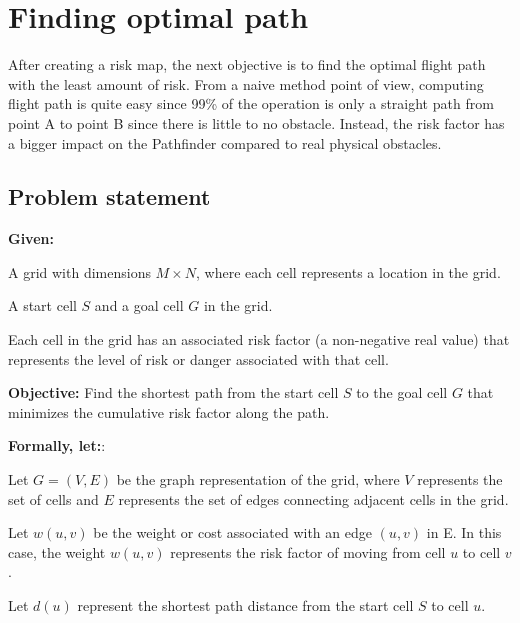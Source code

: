 \documentclass[12pt]{report}
\begin{document}
    \section{Finding optimal path}
        After creating a risk map, the next objective is to find the optimal flight path with the least amount of risk.
        From a naive method point of view, computing flight path is quite easy since 99\% of the operation is only a
        straight path from point A to point B since there is little to no obstacle. Instead, the risk factor has a
        bigger impact on the Pathfinder compared to real physical obstacles.

        \subsection{Problem statement}
        \textbf{Given:}
        \begin{myitemize}
            \item A grid with dimensions \(M \times N\), where each cell represents a location in the grid.
            \item A start cell \(S\) and a goal cell \(G\) in the grid. 
            \item Each cell in the grid has an associated risk factor (a non-negative real value) that represents the
            level of risk or danger associated with that cell.
        \end{myitemize}

        \textbf{Objective:} Find the shortest path from the start cell \(S\) to the goal cell \(G\) that minimizes the
        cumulative risk factor along the path.
        
        \textbf{Formally, let:}:
        \begin{myitemize}
            \item Let \(G = (V, E)\)  be the graph representation of the grid, where \(V\) represents the set of cells
            and \(E\) represents the set of edges connecting adjacent cells in the grid.
            \item Let \(w(u, v)\) be the weight or cost associated with an edge \((u, v)\) in E. In this case, the
            weight \(w(u, v)\)  represents the risk factor of moving from cell \(u\) to cell \(v\).
            \item Let \(d(u)\) represent the shortest path distance from the start cell \(S\) to cell \(u\).
        \end{myitemize}
\end{document}
